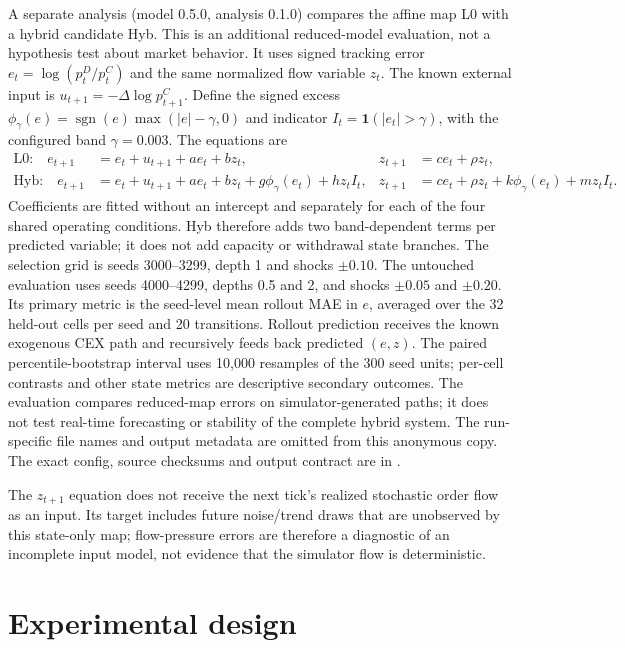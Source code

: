 A separate analysis (model 0.5.0, analysis 0.1.0) compares the affine map L0 with a hybrid candidate Hyb. This is an additional reduced-model evaluation, not a hypothesis test about market behavior. It uses signed tracking error $e_t=\log(p_t^D/p_t^C)$ and the same normalized flow variable $z_t$. The known external input is $u_{t+1}=-\Delta\log p^C_{t+1}$. Define the signed excess $\phi_\gamma(e)=\operatorname{sgn}(e)\max(|e|-\gamma,0)$ and indicator $I_t=\mathbf{1}(|e_t|>\gamma)$, with the configured band $\gamma=0.003$. The equations are
\begin{align}
  \text{L0:}\quad e_{t+1}&=e_t+u_{t+1}+a e_t+b z_t,& z_{t+1}&=c e_t+\rho z_t,\\
  \text{Hyb:}\quad e_{t+1}&=e_t+u_{t+1}+a e_t+b z_t+g\phi_\gamma(e_t)+h z_t I_t,&
  z_{t+1}&=c e_t+\rho z_t+k\phi_\gamma(e_t)+m z_t I_t.
\end{align}
Coefficients are fitted without an intercept and separately for each of the four shared operating conditions. Hyb therefore adds two band-dependent terms per predicted variable; it does not add capacity or withdrawal state branches. The selection grid is seeds 3000--3299, depth 1 and shocks $\pm0.10$. The untouched evaluation uses seeds 4000--4299, depths 0.5 and 2, and shocks $\pm0.05$ and $\pm0.20$. Its primary metric is the seed-level mean rollout MAE in $e$, averaged over the 32 held-out cells per seed and 20 transitions. Rollout prediction receives the known exogenous CEX path and recursively feeds back predicted $(e,z)$. The paired percentile-bootstrap interval uses 10,000 resamples of the 300 seed units; per-cell contrasts and other state metrics are descriptive secondary outcomes. The evaluation compares reduced-map errors on simulator-generated paths; it does not test real-time forecasting or stability of the complete hybrid system. \ifdefined\blindreviewmode
The run-specific file names and output metadata are omitted from this anonymous copy.
\else
The exact config, source checksums and output contract are in .
\fi

The $z_{t+1}$ equation does not receive the next tick's realized stochastic order flow as an input. Its target includes future noise/trend draws that are unobserved by this state-only map; flow-pressure errors are therefore a diagnostic of an incomplete input model, not evidence that the simulator flow is deterministic.

\section{Experimental design}

